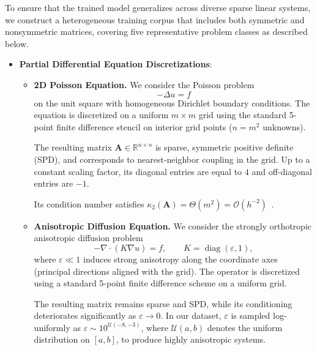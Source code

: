 \documentclass[11pt,a4paper]{article}
\theoremstyle{plain}
\theoremstyle{definition}
\theoremstyle{remark}
\begin{document}
To ensure that the trained model generalizes across diverse sparse linear systems, we construct a heterogeneous training corpus that includes both symmetric and nonsymmetric matrices, covering five representative problem classes as described below.
% 


\begin{itemize}


\item \textbf{Partial Differential Equation Discretizations}:
\begin{itemize}

\item \textbf{2D Poisson Equation.}
We consider the Poisson problem
\begin{equation*}
-\Delta u = f
\end{equation*}
on the unit square with homogeneous Dirichlet boundary conditions. The equation is discretized on a uniform $m \times m$ grid using the standard 5-point finite difference stencil on interior grid points ($n = m^2$ unknowns).  

The resulting matrix $\mathbf{A} \in \mathbb{R}^{n \times n}$ is sparse, symmetric positive definite (SPD), and corresponds to nearest-neighbor coupling in the grid. Up to a constant scaling factor, its diagonal entries are equal to $4$ and off-diagonal entries are $-1$.  

Its condition number satisfies $\kappa_2(\mathbf{A}) = \Theta(m^2) = \mathcal{O}(h^{-2})$~\cite{trefethen1997numerical}.

\item \textbf{Anisotropic Diffusion Equation.}
We consider the strongly orthotropic anisotropic diffusion problem
\begin{equation*}
-\nabla \cdot (K \nabla u) = f,
\qquad K = \operatorname{diag}(\varepsilon, 1),
\end{equation*}
where $\varepsilon \ll 1$ induces strong anisotropy along the coordinate axes (principal directions aligned with the grid). The operator is discretized using a standard 5-point finite difference scheme on a uniform grid.

The resulting matrix remains sparse and SPD, while its conditioning deteriorates significantly as $\varepsilon \to 0$.  In our dataset, $\varepsilon$ is sampled log-uniformly as  $\varepsilon \sim 10^{\mathcal{U}(-8,-3)} $, where  $\mathcal{U}(a,b) $ denotes the uniform distribution on  $[a,b] $, to produce highly anisotropic systems.




\end{itemize}
\end{itemize}
\end{document}
